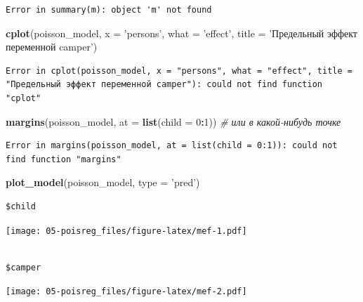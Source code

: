 \documentclass[]{book}
\newenvironment{Shaded}{\begin{snugshade}}{\end{snugshade}}
\newcommand{\CommentTok}[1]{\textcolor[rgb]{0.56,0.35,0.01}{\textit{#1}}}
\newcommand{\DataTypeTok}[1]{\textcolor[rgb]{0.13,0.29,0.53}{#1}}
\newcommand{\DecValTok}[1]{\textcolor[rgb]{0.00,0.00,0.81}{#1}}
\newcommand{\KeywordTok}[1]{\textcolor[rgb]{0.13,0.29,0.53}{\textbf{#1}}}
\newcommand{\NormalTok}[1]{#1}
\newcommand{\OperatorTok}[1]{\textcolor[rgb]{0.81,0.36,0.00}{\textbf{#1}}}
\newcommand{\StringTok}[1]{\textcolor[rgb]{0.31,0.60,0.02}{#1}}
\begin{document}
\begin{verbatim}
Error in summary(m): object 'm' not found
\end{verbatim}

\begin{Shaded}
\begin{Highlighting}[]
\KeywordTok{cplot}\NormalTok{(poisson_model, }\DataTypeTok{x =} \StringTok{'persons'}\NormalTok{, }\DataTypeTok{what =} \StringTok{'effect'}\NormalTok{, }\DataTypeTok{title =} \StringTok{'Предельный эффект переменной camper'}\NormalTok{)}
\end{Highlighting}
\end{Shaded}

\begin{verbatim}
Error in cplot(poisson_model, x = "persons", what = "effect", title = "Предельный эффект переменной camper"): could not find function "cplot"
\end{verbatim}

\begin{Shaded}
\begin{Highlighting}[]
\KeywordTok{margins}\NormalTok{(poisson_model, }\DataTypeTok{at =} \KeywordTok{list}\NormalTok{(}\DataTypeTok{child =} \DecValTok{0}\OperatorTok{:}\DecValTok{1}\NormalTok{)) }\CommentTok{# или в какой-нибудь точке}
\end{Highlighting}
\end{Shaded}

\begin{verbatim}
Error in margins(poisson_model, at = list(child = 0:1)): could not find function "margins"
\end{verbatim}

\begin{Shaded}
\begin{Highlighting}[]
\KeywordTok{plot_model}\NormalTok{(poisson_model, }\DataTypeTok{type =} \StringTok{'pred'}\NormalTok{)}
\end{Highlighting}
\end{Shaded}

\begin{verbatim}
$child
\end{verbatim}

\texttt{[image: 05-poisreg\_files/figure-latex/mef-1.pdf]}

\begin{verbatim}

$camper
\end{verbatim}

\texttt{[image: 05-poisreg\_files/figure-latex/mef-2.pdf]}
\end{document}
